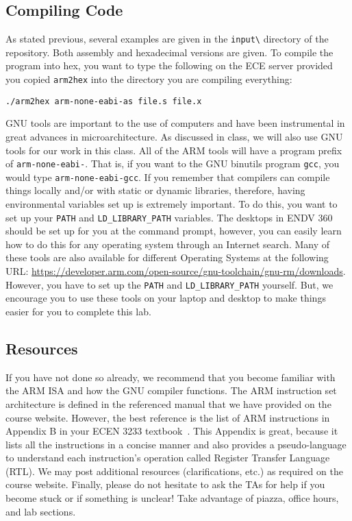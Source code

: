 \documentclass{article}
\begin{document}
\subsection{Compiling Code}

As stated previous, several examples are given in the \verb+input\+
directory of the repository.  Both assembly and hexadecimal versions
are given.  To compile the program into hex, you want to type the
following on the ECE server provided you copied \verb+arm2hex+ into
the directory you are compiling everything:
\begin{verbatim}
./arm2hex arm-none-eabi-as file.s file.x
\end{verbatim}

GNU tools are important to the use of computers and have been
instrumental in great advances in microarchitecture.  As discussed in
class, we will also use GNU tools for our work in this class.  All of
the ARM tools will have a program prefix of \verb+arm-none-eabi-+.
That is, if you want to the GNU binutils program \verb+gcc+, you
would type \verb+arm-none-eabi-gcc+.  If you remember that
compilers can compile things locally and/or with static or dynamic
libraries,
therefore, having environmental variables set up 
is extremely important.  To do this, you want to set up your
\verb+PATH+ and \verb+LD_LIBRARY_PATH+ variables.  The desktops in
ENDV 360 should be set up for you at the command prompt, however, you
can easily learn how to do this for any operating system through an
Internet search.  
Many of these tools are also available for different Operating Systems 
at the following URL:
\url{https://developer.arm.com/open-source/gnu-toolchain/gnu-rm/downloads}.
However, you have to set up the \verb+PATH+ and \verb+LD_LIBRARY_PATH+
yourself.  But, we encourage you to use these tools on your laptop and
desktop to make things easier for you to complete this lab.

\subsection{Resources}

If you have not done so already, we recommend that you 
become familiar with the ARM ISA and how the GNU compiler functions.
The ARM instruction set architecture is defined
in the referenced manual that we have provided on the course
website. 
However, the best reference is the list of ARM instructions in
Appendix B in your ECEN 3233 textbook~\cite{Harris:2015:DDC:2815529}.
This Appendix is great, because it lists all the instructions in a
concise manner and also provides a pseudo-language to understand each
instruction's operation called Register Transfer Language (RTL).
We may post
additional resources (clarifications, etc.) as required on the course
website. Finally, please do not hesitate to ask the TAs for help if you
become stuck
or if something is unclear! Take advantage of piazza,
office hours, and lab sections.  
\end{document}
